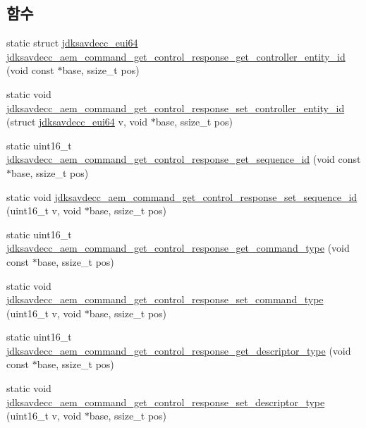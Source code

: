 \subsection*{함수}
\begin{DoxyCompactItemize}
\item 
static struct \hyperlink{structjdksavdecc__eui64}{jdksavdecc\+\_\+eui64} \hyperlink{group__command__get__control__response_ga1716019174b0339cccfa568804499d47}{jdksavdecc\+\_\+aem\+\_\+command\+\_\+get\+\_\+control\+\_\+response\+\_\+get\+\_\+controller\+\_\+entity\+\_\+id} (void const $\ast$base, ssize\+\_\+t pos)
\item 
static void \hyperlink{group__command__get__control__response_gad6aaffc9b9aa5586b4555fd720b4266b}{jdksavdecc\+\_\+aem\+\_\+command\+\_\+get\+\_\+control\+\_\+response\+\_\+set\+\_\+controller\+\_\+entity\+\_\+id} (struct \hyperlink{structjdksavdecc__eui64}{jdksavdecc\+\_\+eui64} v, void $\ast$base, ssize\+\_\+t pos)
\item 
static uint16\+\_\+t \hyperlink{group__command__get__control__response_gacfc24971279c9f92ff1332f89809a2e9}{jdksavdecc\+\_\+aem\+\_\+command\+\_\+get\+\_\+control\+\_\+response\+\_\+get\+\_\+sequence\+\_\+id} (void const $\ast$base, ssize\+\_\+t pos)
\item 
static void \hyperlink{group__command__get__control__response_ga9211dc6d3881fe3a5696d400d0967717}{jdksavdecc\+\_\+aem\+\_\+command\+\_\+get\+\_\+control\+\_\+response\+\_\+set\+\_\+sequence\+\_\+id} (uint16\+\_\+t v, void $\ast$base, ssize\+\_\+t pos)
\item 
static uint16\+\_\+t \hyperlink{group__command__get__control__response_ga81c3b9c654b48dbd265a3be821c7c392}{jdksavdecc\+\_\+aem\+\_\+command\+\_\+get\+\_\+control\+\_\+response\+\_\+get\+\_\+command\+\_\+type} (void const $\ast$base, ssize\+\_\+t pos)
\item 
static void \hyperlink{group__command__get__control__response_ga6a7faf89b6fd24d14e533a2ba8717b87}{jdksavdecc\+\_\+aem\+\_\+command\+\_\+get\+\_\+control\+\_\+response\+\_\+set\+\_\+command\+\_\+type} (uint16\+\_\+t v, void $\ast$base, ssize\+\_\+t pos)
\item 
static uint16\+\_\+t \hyperlink{group__command__get__control__response_ga720cf2ab5dbadf7fd892d6c8d63e6db0}{jdksavdecc\+\_\+aem\+\_\+command\+\_\+get\+\_\+control\+\_\+response\+\_\+get\+\_\+descriptor\+\_\+type} (void const $\ast$base, ssize\+\_\+t pos)
\item 
static void \hyperlink{group__command__get__control__response_ga5fc050028d010f6273b5c221e221a85b}{jdksavdecc\+\_\+aem\+\_\+command\+\_\+get\+\_\+control\+\_\+response\+\_\+set\+\_\+descriptor\+\_\+type} (uint16\+\_\+t v, void $\ast$base, ssize\+\_\+t pos)

\end{DoxyCompactItemize}
